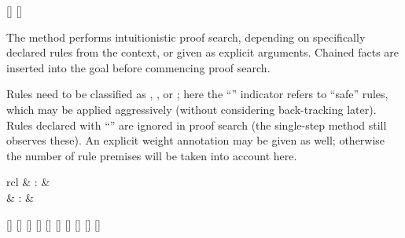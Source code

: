 \begin{isabellebody}
\begin{isamarkuptext}
  \begin{railoutput}
[]
\rail@plus
{}
[]
\rail@endplus
\rail@end
\end{railoutput}


  The \hyperlink{method.HOL.iprover}{\mbox{}} method performs intuitionistic proof
  search, depending on specifically declared rules from the context,
  or given as explicit arguments.  Chained facts are inserted into the
  goal before commencing proof search.

  Rules need to be classified as \hyperlink{attribute.Pure.intro}{\mbox{}},
  \hyperlink{attribute.Pure.elim}{\mbox{}}, or \hyperlink{attribute.Pure.dest}{\mbox{}}; here the
  ``'' indicator refers to ``safe'' rules, which may be
  applied aggressively (without considering back-tracking later).
  Rules declared with ``'' are ignored in proof search (the
  single-step \hyperlink{method.Pure.rule}{\mbox{}} method still observes these).  An
  explicit weight annotation may be given as well; otherwise the
  number of rule premises will be taken into account here.%
\end{isamarkuptext}%
\isamarkuptrue%
%
\isamarkuptrue%
%
\begin{isamarkuptext}%
\begin{matharray}{rcl}
    \hypertarget{method.HOL.meson}{\hyperlink{method.HOL.meson}{\mbox{}}} & : &  \\
    \hypertarget{method.HOL.metis}{\hyperlink{method.HOL.metis}{\mbox{}}} & : &  \\
  \end{matharray}

  \begin{railoutput}
[]
\rail@bar
{}
[]
\rail@endbar
\rail@end
{}
[]
\rail@bar
{}
[]
\rail@bar
{}[]
[]
[]
[]
\rail@endbar
{}[]
\rail@endbar
\rail@bar
{}
[]
\rail@endbar
\rail@end
\end{railoutput}



\end{isamarkuptext}
\end{isabellebody}
